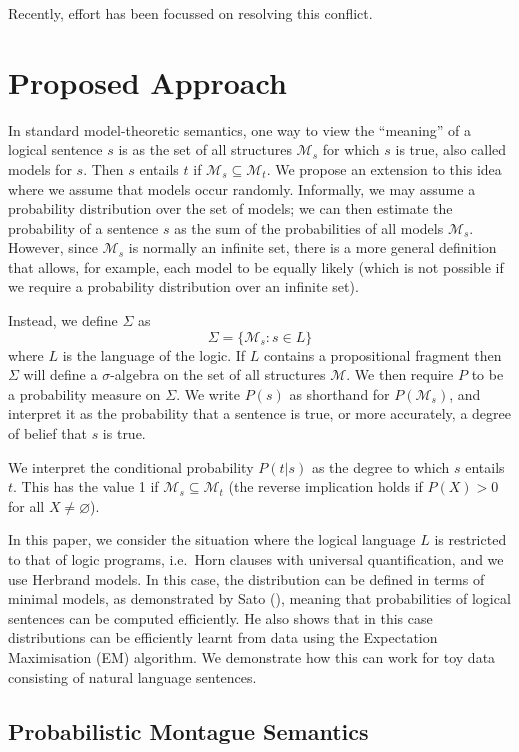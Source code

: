\documentclass[letterpaper]{article}
\begin{document}
Recently, effort has been focussed on resolving this conflict.

\section{Proposed Approach}

In standard model-theoretic semantics, one way to view the ``meaning''
of a logical sentence $s$ is as the set of all structures
$\mathcal{M}_s$ for which $s$ is true, also called models for
$s$. Then $s$ entails $t$ if $\mathcal{M}_s \subseteq
\mathcal{M}_t$. We propose an extension to this idea where we assume
that models occur randomly. Informally, we may assume a probability
distribution over the set of models; we can then estimate the
probability of a sentence $s$ as the sum of the probabilities of all
models $\mathcal{M}_s$. However, since $\mathcal{M}_s$ is normally an
infinite set, there is a more general definition that allows, for
example, each model to be equally likely (which is not possible if we
require a probability distribution over an infinite set).

Instead, we define $\Sigma$ as
$$\Sigma = \{\mathcal{M}_s : s \in L\}$$
where $L$ is the language of the logic. If $L$ contains a
propositional fragment then $\Sigma$ will define a $\sigma$-algebra on
the set of all structures $\mathcal{M}$. We then require $P$ to be a
probability measure on $\Sigma$. We write $P(s)$ as shorthand for
$P(\mathcal{M}_s)$, and interpret it as the probability that a sentence
is true, or more accurately, a degree of belief that $s$ is true.

We interpret the conditional probability $P(t|s)$ as the degree to
which $s$ entails $t$. This has the value 1 if $\mathcal{M}_s
\subseteq \mathcal{M}_t$ (the reverse implication holds if $P(X) >
0$ for all $X \neq \varnothing$).

In this paper, we consider the situation where the logical language
$L$ is restricted to that of logic programs, i.e.~Horn clauses with
universal quantification, and we use Herbrand models. In this case,
the distribution can be defined in terms of minimal models, as
demonstrated by Sato (\citeyear{Sato:95}), meaning that probabilities
of logical sentences can be computed efficiently. He also shows that
in this case distributions can be efficiently learnt from data using
the Expectation Maximisation (EM) algorithm. We demonstrate how this
can work for toy data consisting of natural language sentences.

\subsection{Probabilistic Montague Semantics}
\end{document}
